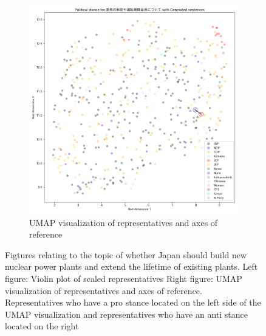 \documentclass[final,5p,times,twocolumn,authoryear]{elsarticle}
\begin{document}
\begin{figure}[h]
\begin{subfigure}{0.22\textwidth}
      \includegraphics[width=1\linewidth]{figs/results/nuclear/buildingnew_umap_gen.png}
      \caption{UMAP visualization of representatives and axes of reference}
    \end{subfigure}
\caption{Figtures relating to the topic of whether Japan should build new nuclear power plants and extend the lifetime of existing plants. Left figure: Violin plot of scaled representatives Right figure: UMAP visualization of representatives and axes of reference. Representatives who have a pro stance located on the left side of the UMAP visualization and representatives who have an anti stance located on the right}
\label{fig: results-nuclear-new}
\end{figure}
\end{document}
